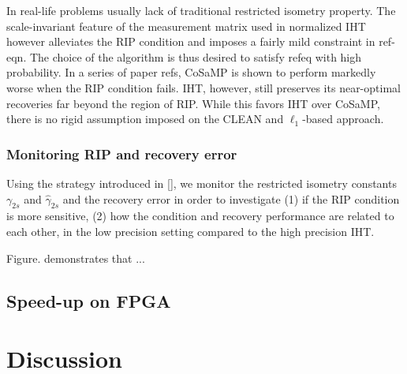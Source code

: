 \documentclass{article}
\begin{document}
In real-life problems usually lack of traditional restricted isometry property. The scale-invariant feature of the measurement matrix used in normalized IHT however alleviates the RIP condition and imposes a fairly mild constraint in ref-eqn. The choice of the algorithm is thus desired to satisfy refeq with high probability. In a series of paper refs, CoSaMP is shown to perform markedly worse when the RIP condition fails. IHT, however, still preserves its near-optimal recoveries far beyond the region of RIP. While this favors IHT over CoSaMP, there is no rigid assumption imposed on the CLEAN and $\ell_1$-based approach. 
 




\subsubsection{Monitoring RIP and recovery error}
Using the strategy introduced in [], we monitor the restricted isometry constants $\gamma_{2s}$ and $\hat{\gamma}_{2s}$ and the recovery error in order to investigate (1) if the RIP condition is more sensitive, (2) how the condition and recovery performance are related to each other, in the low precision setting compared to the high precision IHT.

Figure. demonstrates that ...






\subsection{Speed-up on FPGA}





\section{Discussion}



\newpage
\
\newpage


\end{document}

